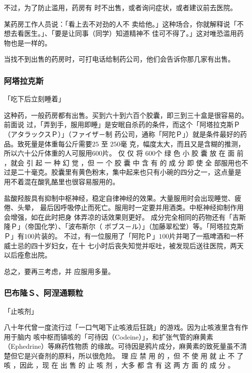 \documentclass[UTF8]{ctexart}
\begin{document}
不过，为了防止滥用，药房有
时不出售，或者询问症状，或者建议前去医院。

某药房工作人员说：「看上去不对劲的人不
卖给他。」这种场合，你就解释说「不想去看医生。」、「要是让同事（同学）知道精神不
佳可不得了。」这对唯恐滥用药物也是一样的。

当找不到出售的药房时，可打电话给制药公司，他们会告诉你那几家有出售。

\subsubsection{阿塔拉克斯}
\begin{flushright}
「吃下后立刻睡着」
\end{flushright}

这种药，一般药房都有出售。买到六十到六百个胶囊，即三到三十盒是很容易的。前面说
过，「弄到手，服用即睡」是安眠自杀药的条件，而这个「阿塔拉克斯Ｐ（アタラックスＰ）」（ファイザ－制 药公司，通称「阿陀Ｐ」）就是条件最好的药品。致死量是体重每公斤需要$25$ 至 $250$毫 克，幅度太大，而且又是含糊的推测，所以六十公斤体重的人可服用$600$片。 仅 仅 将 $600$个 绿 色 小 胶 囊 放 在 面 前 ，就会 引 起 一 种 幻 觉 ，但 一 个 胶 囊 中 含 有 的 成 分 即 使 全 部服用也不过是二十毫克。胶囊里有黄色粉末，集中起来也只有小碗的四分之一，这点量是 用不着混在酸乳酪里也很容易服用的。

盐酸羟胺具有抑制中枢神经，稳定自律神经的效果。大量服用时会出现睡觉、疲倦、头晕， 最后因呼吸停止而死亡。服用时一定要并用酒类。中枢神经抑制作用会增强，如在此时把身 体弄凉的话效果则更好。 成分完全相同的药物还有「吉斯隆Ｐ」（帝国化学）、「波布斯尔（ ボブス－ル）」（加藤翠松堂）等。「阿塔拉克斯Ｐ」有$100$片装的。 不过，有一位服用了「阿陀Ｐ」$100$片并喝了一瓶啤酒和一杯威士忌的四十岁妇女，在十 七小时后丧失知觉并呕吐，被发现后送往医院，两天以后痊愈出院。

总之，要再三考虑，并 应服用多量。

\subsubsection{巴布隆Ｓ、阿涅通颗粒}
\begin{flushright}
「止咳剂」
\end{flushright}

八十年代曾一度流行过「一口气喝下止咳液后狂跳」的游戏。因为止咳液里含有作用于脑内
咳中枢而镇咳的「可待因（Codeine）」，和扩张气管的麻黄素（Ephedrine）等麻药性物质
的缘故。可待因是鸦片成分，麻黄素的致死量虽不清楚但它是兴奋剂的原料，所以很危险。
理 应 禁 用 的 ，但 不 使 用 就 止 不 了 咳 ，因此 ，现 在 出 售 的 止 咳 剂 ，大多 都 含 有 这 两 方 面 的 成 分 。
\end{document}
